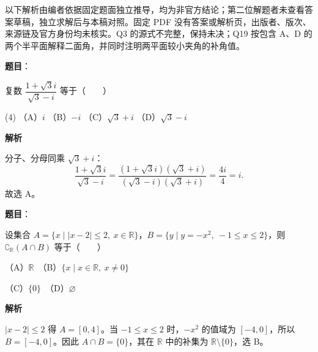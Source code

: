 

\begin{gktip}
以下解析由编者依据固定题面独立推导，均为非官方结论；第二位解题者未查看答案草稿，独立求解后与本稿对照。固定 PDF 没有答案或解析页，出版者、版次、来源链及官方身份均未核实。Q3 的源式不完整，保持未决；Q19 按包含 A、D 的两个半平面解释二面角，并同时注明两平面较小夹角的补角值。
\end{gktip}

\begin{answer}

\textbf{题目}：

复数 $\dfrac{1+\sqrt{3}i}{\sqrt{3}-i}$ 等于\mbox{（　　）}

\begin{gkopts}(4)
\task （A）$i$
\task （B）$-i$
\task （C）$\sqrt{3}+i$
\task （D）$\sqrt{3}-i$
\end{gkopts}

\textbf{解析}

分子、分母同乘 $\sqrt3+i$：
\nopagebreak[4]
\[
\frac{1+\sqrt3i}{\sqrt3-i}
=\frac{(1+\sqrt3i)(\sqrt3+i)}{(\sqrt3-i)(\sqrt3+i)}
=\frac{4i}{4}=i.
\]
故选 A。


\end{answer}
\begin{answer}

\textbf{题目}：

设集合 $A=\{x\mid |x-2|\leqslant 2,\ x\in\mathbb R\}$，$B=\{y\mid y=-x^2,\ -1\leqslant x\leqslant 2\}$，则 $\complement_{\mathbb R}(A\cap B)$ 等于\mbox{（　　）}

（A）$\mathbb R$　（B）$\{x\mid x\in\mathbb R,\ x\ne0\}$

（C）$\{0\}$　（D）$\varnothing$

\textbf{解析}

$|x-2|\le2$ 得 $A=[0,4]$。当 $-1\le x\le2$ 时，$-x^2$ 的值域为 $[-4,0]$，所以 $B=[-4,0]$。因此 $A\cap B=\{0\}$，其在 $\mathbb R$ 中的补集为 $\mathbb R\setminus\{0\}$，选 B。


\end{answer}
